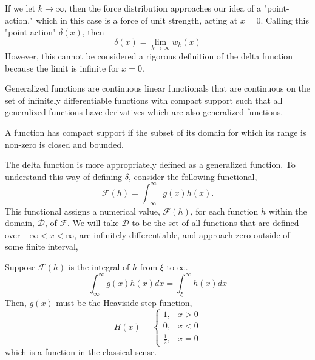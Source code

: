 If we let \(k \rightarrow \infty\), then the force distribution approaches our idea of a "point-action," which in this case is a force of unit strength, acting at \(x=0\). Calling this "point-action" \(\delta(x)\), then
\begin{equation}
    \delta(x) = \lim_{k\rightarrow \infty} w_k(x)
\end{equation}
However, this cannot be considered a rigorous definition of the delta function because the limit is infinite for \(x=0\). 

\begin{definition}
    Generalized functions are continuous linear functionals that are continuous on the set of infinitely differentiable functions with compact support such that all generalized functions have derivatives which are also generalized functions.
\end{definition}

\begin{definition}
    A function has compact support if the subset of its domain for which its range is non-zero is closed and bounded.
\end{definition}

The delta function is more appropriately defined as a generalized function. To understand this way of defining \(\delta\), consider the following functional,
\begin{equation}
    \mathcal{F}(h) = \int_{-\infty}^{\infty} g(x)h(x).
\end{equation}
This functional assigns a numerical value, \(\mathcal{F}(h)\), for each function \(h\) within the domain, \(\mathcal{D}\), of \(\mathcal{F}\). We will take \(\mathcal{D}\) to be the set of all functions that are defined over \(-\infty <x<\infty\), are infinitely differentiable, and approach zero outside of some finite interval,

Suppose \(\mathcal{F}(h)\) is the integral of \(h\) from \(\xi\) to \(\infty\).
\begin{equation}
    \int_{\infty}^{\infty} g(x)h(x)dx = \int_{\xi}^{\infty} h(x) dx
\end{equation}
Then, \(g(x)\) must be the Heaviside step function,
\begin{equation}
    H(x) = \begin{cases}
        1, & x>0\\
        0, & x<0\\
        \frac{1}{2}, & x=0
    \end{cases}
\end{equation}
which is a function in the classical sense.

